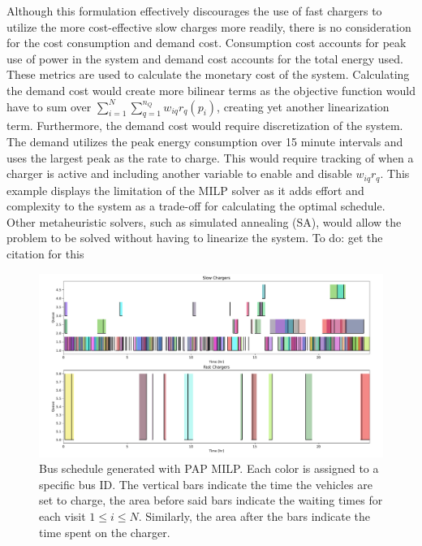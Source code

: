 \documentclass[letterpaper, 10pt, conference]{IEEEtran}
\newcommand{\TODO}[1]{{\color{green} To do: #1}}                                %
\begin{document}
Although this formulation effectively discourages the use of fast chargers to utilize the more cost-effective slow
charges more readily, there is no consideration for the cost consumption and demand cost. Consumption cost accounts for
peak use of power in the system and demand cost accounts for the total energy used. These metrics are used to calculate
the monetary cost of the system. Calculating the demand cost would create more bilinear terms as the objective function
would have to sum over $\sum_{i=1}^N \sum_{q=1}^{n_Q} w_{iq}{r_q}(p_i)$, creating yet another linearization term. Furthermore, the
demand cost would require discretization of the system. The demand utilizes the peak energy consumption over 15 minute
intervals and uses the largest peak as the rate to charge. This would require tracking of when a charger is active and
including another variable to enable and disable $w_{iq}r_q$. This example displays the limitation of the MILP solver as
it adds effort and complexity to the system as a trade-off for calculating the optimal schedule. Other metaheuristic
solvers, such as simulated annealing (SA), would allow the problem to be solved without having to linearize the system.
\TODO{get the citation for this}

\begin{figure}[ht]
	\centering
	\includegraphics[trim=1in 0.25in 1in 0.5in, width=\linewidth]{schedule.pdf}
	\caption{Bus schedule generated with PAP MILP. Each color is assigned to a specific bus ID. The vertical bars indicate the time the vehicles are set to charge, the area before said bars indicate the waiting times for each visit $1 \leq i \leq N$. Similarly, the area after the bars indicate the time spent on the charger.}
	\label{fig:schedule}
\end{figure}
\end{document}
